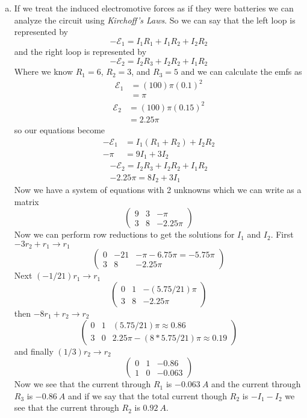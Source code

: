 \documentclass[11pt]{article}
\numberwithin{equation}{section}
\newcommand{\emf}{\mathcal{E}}
\begin{document}
\begin{enumerate}[(a)]
\item
If we treat the induced electromotive forces as if they were batteries we can analyze the circuit using \emph{Kirchoff's Laws}. So we can say that the left loop is represented by
$$-\emf_1 = I_1R_1+I_1R_2+I_2R_2$$
and the right loop is represented by
$$-\emf_2 = I_2R_3+I_2R_2+I_1R_2$$
Where we know $R_1 = 6$, $R_2=3$, and $R_3=5$ and we can calculate the emfs as
\begin{align*}
\emf_1 &= (100)\pi(0.1)^2\\
&= \pi
\end{align*}
\begin{align*}
\emf_2 &= (100)\pi(0.15)^2\\
&= 2.25\pi
\end{align*}
so our equations become
\begin{align*}
-\emf_1 &= I_1(R_1+R_2)+I_2R_2\\
-\pi &= 9I_1+3I_2
\end{align*}
\begin{align*}
-\emf_2 = I_2R_3+I_2R_2+I_1R_2\\
-2.25\pi = 8I_2+3I_1
\end{align*}
Now we have a system of equations with 2 unknowns which we can write as a matrix
$$\left(\begin{array}{cc|r}
	9	&3	&-\pi\\	
	3	&8	&-2.25\pi	
	\end{array}\right)$$
Now we can perform row reductions to get the solutions for $I_1$ and $I_2$. First $-3r_2+r_1\rightarrow r_1$
$$\left(\begin{array}{cc|r}
	0	&-21	&-\pi-6.75\pi = -5.75\pi\\	
	3	&8	&-2.25\pi	
	\end{array}\right)$$
Next $(-1/21)r_1\rightarrow r_1$
$$\left(\begin{array}{cc|r}
	0	&1	&-(5.75/21)\pi\\	
	3	&8	&-2.25\pi	
	\end{array}\right)$$
then $-8r_1+r_2\rightarrow r_2$
$$\left(\begin{array}{cc|r}
	0	&1	&(5.75/21)\pi\approx0.86\\	
	3	&0	&2.25\pi - (8*5.75/21)\pi\approx0.19
	\end{array}\right)$$
and finally $(1/3)r_2\rightarrow r_2$
$$\left(\begin{array}{cc|r}
	0	&1	&-0.86\\	
	1	&0	&-0.063
	\end{array}\right)$$
Now we see that the current through $R_1$ is $-0.063\ A$ and the current through $R_3$ is $-0.86\ A$ and if we say that the total current though $R_2$ is $-I_1-I_2$ we see that the current through $R_2$ is $0.92\ A$.
\end{enumerate}
\end{document}
